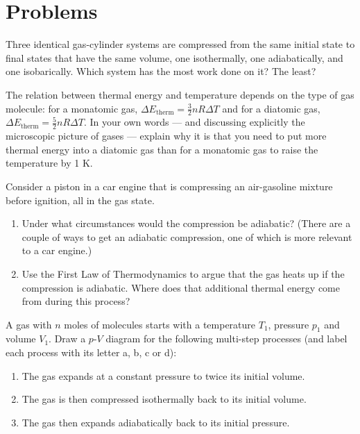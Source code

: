 \newpage

\section*{Problems}

\begin{problem} 
 Three identical gas-cylinder systems are compressed from the
 same initial state to final states that have the same volume, one
 isothermally, one adiabatically, and one isobarically. Which
 system has the most work done on it? The least?
\label{prob:ThreeCompress}
\end{problem}

\begin{problem}
The relation between thermal energy and temperature depends on the type
of gas molecule:  for a monatomic gas, $\Delta E_\text{therm} = \frac{3}{2}nR\Delta T$
and for a diatomic gas, $\Delta E_\text{therm} = \frac{5}{2}nR\Delta T$. In your
own words --- and discussing explicitly the microscopic picture of gases ---
explain why it is that you need to put more thermal energy into a diatomic
gas than for a monatomic gas to raise the temperature by 1 K.
\end{problem}

\begin{problem}
Consider a piston in a car engine that is compressing an air-gasoline
mixture before ignition, all in the gas state.  
\begin{enumerate}
\item Under what circumstances would the compression be adiabatic? 
(There are a couple of ways to get an adiabatic compression, one of
which is more relevant to a car engine.)
\item Use the First Law of Thermodynamics to argue that the gas heats
up if the compression is adiabatic.  Where does that additional thermal energy
come from during this process?
\end{enumerate} 
\end{problem}

\begin{problem}
A gas with $n$ moles of molecules starts with a temperature $T_1$,
pressure $p_1$ and volume $V_1$. Draw a $p$-$V$ diagram for the following
multi-step processes (and label each process with its letter a, b, c
or d): 
\begin{enumerate}
\item The gas expands at a constant pressure to twice its initial
volume.
\item The gas is then compressed isothermally back to its initial
volume.
\item The gas then expands adiabatically back to its initial
pressure.
\end{enumerate}
\end{problem}

